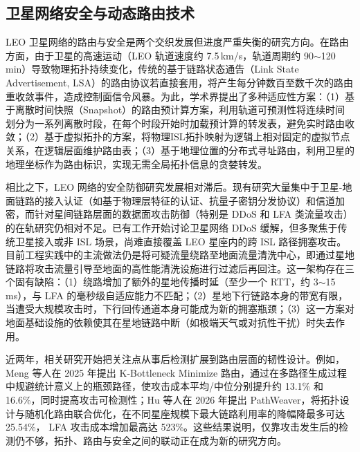 \subsection{卫星网络安全与动态路由技术}

LEO 卫星网络的路由与安全是两个交织发展但进度严重失衡的研究方向。在路由方面，由于卫星的高速运动（LEO 轨道速度约 7.5\,km/s，轨道周期约 90$\sim$120\,min）导致物理拓扑持续变化，传统的基于链路状态通告（Link State Advertisement, LSA）的路由协议若直接套用，将产生每分钟数百至数千次的路由重收敛事件，造成控制面信令风暴。为此，学术界提出了多种适应性方案：（1）基于离散时间快照（Snapshot）的路由预计算方案，利用轨道可预测性将连续时间划分为一系列离散时段，在每个时段开始时加载预计算的转发表，避免实时路由收敛；（2）基于虚拟拓扑的方案，将物理ISL拓扑映射为逻辑上相对固定的虚拟节点关系，在逻辑层面维护路由表；（3）基于地理位置的分布式寻址路由，利用卫星的地理坐标作为路由标识，实现无需全局拓扑信息的贪婪转发。

相比之下，LEO 网络的安全防御研究发展相对滞后。现有研究大量集中于卫星-地面链路的接入认证（如基于物理层特征的认证、抗量子密钥分发协议）和信道加密，而针对星间链路层面的数据面攻击防御（特别是 DDoS 和 LFA 类流量攻击）的在轨研究仍相对不足。已有工作开始讨论卫星网络 DDoS 缓解，但多聚焦于传统卫星接入或非 ISL 场景，尚难直接覆盖 LEO 星座内的跨 ISL 路径拥塞攻击。目前工程实践中的主流做法仍是将可疑流量绕路至地面流量清洗中心，即通过星地链路将攻击流量引导至地面的高性能清洗设施进行过滤后再回注。这一架构存在三个固有缺陷：（1）绕路增加了额外的星地传播时延（至少一个 RTT，约 3$\sim$15\,ms），与 LFA 的毫秒级自适应能力不匹配；（2）星地下行链路本身的带宽有限，当遭受大规模攻击时，下行回传通道本身可能成为新的拥塞瓶颈；（3）这一方案对地面基础设施的依赖使其在星地链路中断（如极端天气或对抗性干扰）时失去作用。

近两年，相关研究开始把关注点从事后检测扩展到路由层面的韧性设计。例如，Meng 等人在 2025 年提出 K-Bottleneck Minimize 路由，通过在多路径生成过程中规避统计意义上的瓶颈路径，使攻击成本平均/中位分别提升约 13.1\% 和 16.6\%，同时提高攻击可检测性；Hu 等人在 2026 年提出 PathWeaver，将拓扑设计与随机化路由联合优化，在不同星座规模下最大链路利用率的降幅降最多可达 25.54\%， LFA 攻击成本增加最高达 523\%。这些结果说明，仅靠攻击发生后的检测仍不够，拓扑、路由与安全之间的联动正在成为新的研究方向。


